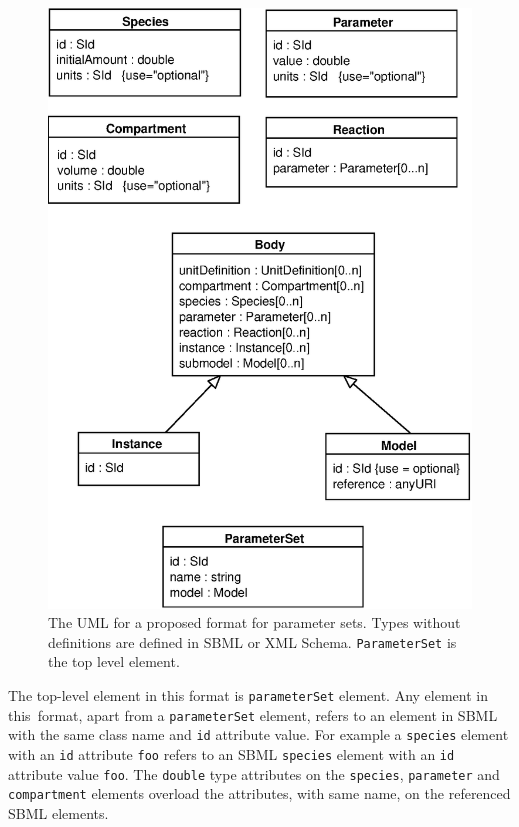 \documentclass[10pt,twocolumntoc]{cekarticle}
\begin{document}
\begin{figure}[h]
  \vspace*{8pt}
  \centering
  \includegraphics[scale = 0.7]{uml}
  \caption{The UML for a proposed format for parameter sets.  Types without definitions are
  defined in SBML or XML Schema.  \texttt{ParameterSet} is the top level element.}
  \label{fig:uml}
\end{figure}

The top-level element in this format is \texttt{parameterSet} element.  Any element in this\
format, apart from a \texttt{parameterSet} element, refers to an element in SBML with the same
class name and \texttt{id} attribute value.  For example a \texttt{species} element with an
\texttt{id} attribute \texttt{foo} refers to an SBML \texttt{species} element with an
\texttt{id} attribute value \texttt{foo}.  The \texttt{double} type attributes on the
\texttt{species}, \texttt{parameter} and \texttt{compartment} elements
overload the attributes, with same name, on the referenced SBML elements.
\end{document}
